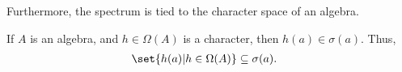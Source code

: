 Furthermore, the spectrum is tied to the character space of an algebra.
\begin{corollary}\label{cor:characters_algebras}
  If $A$ is an algebra, and $h\in \Omega\left( A \right)$ is a character, then $h(a)\in \sigma\left( a \right)$. Thus,
  \begin{align*}
    \set{h(a) | h\in \Omega(A)} &\subseteq \sigma(a).
  \end{align*}
\end{corollary}

